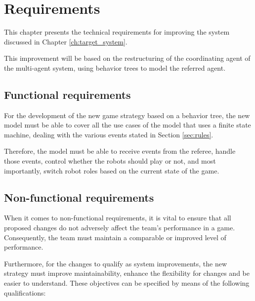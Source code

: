 \chapter{Requirements}
\label{ch:requirements}

This chapter presents the technical requirements for improving the system discussed in Chapter \ref{ch:target_system}.

This improvement will be based on the restructuring of the coordinating agent of the multi-agent system, using behavior trees to model the referred agent.

\section{Functional requirements}
\label{sec:functional_requirements}

For the development of the new game strategy based on a behavior tree, the new model must be able to cover all the use cases of the model that uses a finite state machine, dealing with the various events stated in Section \ref{sec:rules}.

Therefore, the model must be able to receive events from the referee, handle those events, control whether the robots should play or not, and most importantly, switch robot roles based on the current state of the game.

\section{Non-functional requirements}
\label{sec:non_functional_requirements}

When it comes to non-functional requirements, it is vital to ensure that all proposed changes do not adversely affect the team's performance in a game. Consequently, the team must maintain a comparable or improved level of performance.

Furthermore, for the changes to qualify as system improvements, the new strategy must improve maintainability, enhance the flexibility for changes and be easier to understand. These objectives can be specified by means of the following qualifications:

